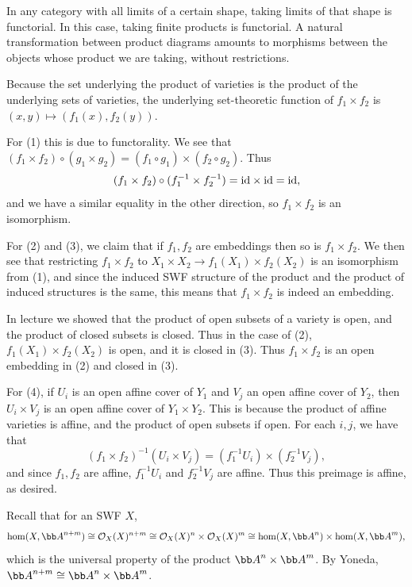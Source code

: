 \eprob

\benum
    \item
    \benum
        \item In any category with all limits of a certain shape, taking limits of that shape is functorial.
        In this case, taking finite products is functorial.
        A natural transformation between product diagrams amounts to morphisms between the objects whose product we are taking, without restrictions.

        Because the set underlying the product of varieties is the product of the underlying sets of varieties, the underlying set-theoretic function of
        $f_1\times f_2$ is $(x,y)\mapsto(f_1(x),f_2(y))$.

        \item For (1) this is due to functorality.
        We see that $(f_1\times f_2)\circ(g_1\times g_2)=(f_1\circ g_1)\times(f_2\circ g_2)$.
        Thus
        $$ (f_1\times f_2) \circ (f_1^{-1}\times f_2^{-1}) = {\rm id}\times{\rm id} = {\rm id} , $$
        and we have a similar equality in the other direction, so $f_1\times f_2$ is an isomorphism.

        For (2) and (3), we claim that if $f_1,f_2$ are embeddings then so is $f_1\times f_2$.
        We then see that restricting $f_1\times f_2$ to $X_1\times X_2\to f_1(X_1)\times f_2(X_2)$ is an isomorphism from (1),
        and since the induced SWF structure of the product and the product of induced structures is the same, this means that $f_1\times f_2$
        is indeed an embedding.

        In lecture we showed that the product of open subsets of a variety is open, and the product of closed subsets is closed.
        Thus in the case of (2), $f_1(X_1)\times f_2(X_2)$ is open, and it is closed in (3).
        Thus $f_1\times f_2$ is an open embedding in (2) and closed in (3).

        For (4), if $U_i$ is an open affine cover of $Y_1$ and $V_j$ an open affine cover of $Y_2$, then $U_i\times V_j$ is an open affine cover of $Y_1\times Y_2$.
        This is because the product of affine varieties is affine, and the product of open subsets if open.
        For each $i,j$, we have that
        $$ (f_1\times f_2)^{-1}(U_i\times V_j) = (f_1^{-1}U_i)\times(f_2^{-1}V_j) , $$
        and since $f_1,f_2$ are affine, $f_1^{-1}U_i$ and $f_2^{-1}V_j$ are affine.
        Thus this preimage is affine, as desired.
    \eenum

    \item Recall that for an SWF $X$,
    $$ \hom(X,\bA^{n+m}) \cong \O_X(X)^{n+m} \cong \O_X(X)^n \times \O_X(X)^m \cong \hom(X,\bA^n) \times \hom(X,\bA^m) , $$
    which is the universal property of the product $\bA^n\times\bA^m$.
    By Yoneda, $\bA^{n+m}\cong\bA^n\times\bA^m$.

